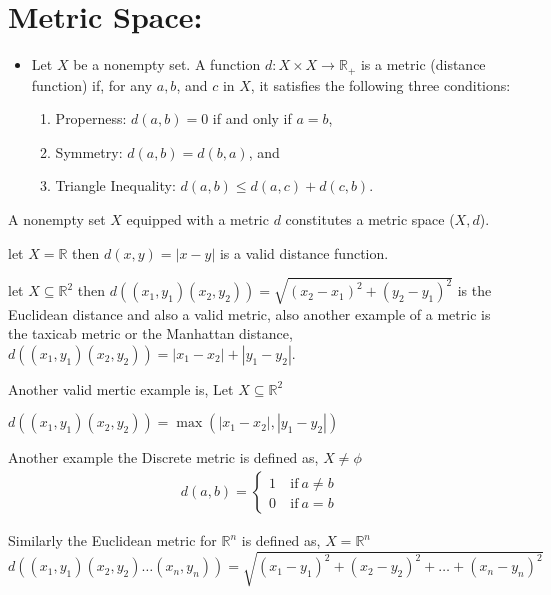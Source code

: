 \documentclass[12pt,a4paper]{article}
\begin{document}
 \section{Metric Space:} 
\begin{itemize}
    \item Let \(X\) be a nonempty set. A function \(d: X \times X \rightarrow \mathbb{R}_{+}\) is a metric (distance function) if, for any \(a, b\), and \(c\) in \(X\), it satisfies the following three conditions:
    \begin{enumerate}
        \item Properness: \(d(a, b)=0\) if and only if \(a=b\),
        \item Symmetry: \(d(a, b)=d(b, a)\), and
        \item Triangle Inequality: \(d(a, b) \leq d(a, c)+d(c, b)\).
    \end{enumerate}
\end{itemize}
\begin{tcolorbox}
    A nonempty set \(X\) equipped with a metric \(d\) constitutes a metric space (\(X, d\)).
\end{tcolorbox}

let \(X=\mathbb{R}\) then \(d(x,y)=|x-y|\) is a valid distance function.

let \(X \subseteq \mathbb{R}^2\) then \(d((x_{1},y_{1})(x_{2},y_{2}))= \sqrt{{(x_{2}-x_{1})}^2 +{(y_{2}-y_{1})}^2}\) is the Euclidean distance and also a valid metric, also another example of a metric is the taxicab metric or the Manhattan distance, \(d((x_{1},y_{1})(x_{2},y_{2}))= |x_{1}-x_{2}| + |y_{1}-y_{2}|\).

Another valid mertic example is, Let \(X \subseteq \mathbb{R}^2\)   

\(d((x_{1},y_{1})(x_{2},y_{2}))= \max\left( |x_{1}-x_{2}|,|y_{1}-y_{2}| \right) \)  

Another example the Discrete metric is defined as, \(X \neq \phi\) 
 \begin{align*}
   d(a,b)= \begin{cases}
        1 & \ \text{if} \ a \neq b\\
        0 & \ \text{if} \ a = b
    \end{cases}
\end{align*}

Similarly the Euclidean metric for \(\mathbb{R}^n\) is defined as, \(X=\mathbb{R}^n\)
\begin{equation*}
    d((x_{1},y_{1})(x_{2},y_{2})\ldots(x_{n},y_{n}))=\sqrt{{(x_{1}-y_{1})}^2 + {(x_{2}-y_{2})}^2 + \ldots + {(x_{n} - y_{n})}^2}
\end{equation*}
\end{document}
